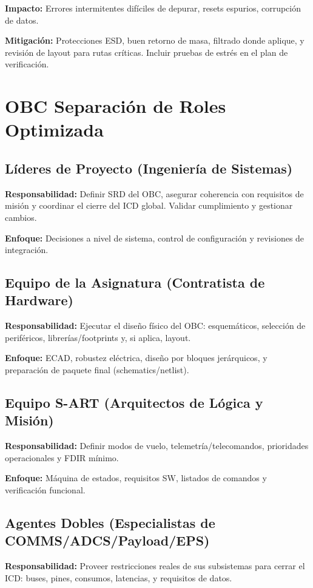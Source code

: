 \textbf{Impacto:} Errores intermitentes difíciles de depurar, resets espurios, corrupción de datos.

\textbf{Mitigación:} Protecciones ESD, buen retorno de masa, filtrado donde aplique, y revisión de layout para rutas críticas. Incluir pruebas de estrés en el plan de verificación.

\chapter{OBC Separación de Roles Optimizada}

\section{Líderes de Proyecto (Ingeniería de Sistemas)}
\textbf{Responsabilidad:} Definir SRD del OBC, asegurar coherencia con requisitos de misión y coordinar el cierre del ICD global. Validar cumplimiento y gestionar cambios.

\textbf{Enfoque:} Decisiones a nivel de sistema, control de configuración y revisiones de integración.

\section{Equipo de la Asignatura (Contratista de Hardware)}
\textbf{Responsabilidad:} Ejecutar el diseño físico del OBC: esquemáticos, selección de periféricos, librerías/footprints y, si aplica, layout.

\textbf{Enfoque:} ECAD, robustez eléctrica, diseño por bloques jerárquicos, y preparación de paquete final (schematics/netlist).

\section{Equipo S-ART (Arquitectos de Lógica y Misión)}
\textbf{Responsabilidad:} Definir modos de vuelo, telemetría/telecomandos, prioridades operacionales y FDIR mínimo.

\textbf{Enfoque:} Máquina de estados, requisitos SW, listados de comandos y verificación funcional.

\section{Agentes Dobles (Especialistas de COMMS/ADCS/Payload/EPS)}
\textbf{Responsabilidad:} Proveer restricciones reales de sus subsistemas para cerrar el ICD: buses, pines, consumos, latencias, y requisitos de datos.

